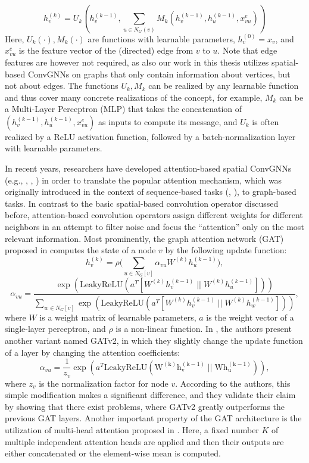 \documentclass[draft,final]{vutinfth} %
\begin{document}
\[
    h_v^{(k)} = U_k (h_v^{(k-1)}, \sum_{u \in N_G(v)} M_k(h_v^{(k-1)}, h_u^{(k-1)}, x_{vu}^{e}))
\]
Here, $U_k(\cdot), M_k(\cdot)$ are functions with learnable parameters, $h_v^{(0)} = x_v$, and $x_{vu}^{e}$ is the feature vector of the (directed) edge from $v$ to $u$. Note that edge features are however not required, as also our work in this thesis utilizes spatial-based ConvGNNs on graphs that only contain information about vertices, but not about edges. 
The functions $U_k, M_k$ can be realized by any learnable function and thus cover many concrete realizations of the concept, for example, $M_k$ can be a Multi-Layer Perceptron (MLP) that takes the concatenation of $(h_v^{(k-1)}, h_u^{(k-1)}, x_{vu}^{e})$ as inputs to compute its message, and $U_k$ is often realized by a ReLU activation function, followed by a batch-normalization \cite{IoffeS15} layer with learnable parameters. 

In recent years, researchers have developed attention-based spatial ConvGNNs (e.g., \cite{Velickovic2018}, \cite{Zhang2018}, \cite{Brody2021}) in order to translate the popular attention mechanism, which was originally introduced in the context of sequence-based tasks (\cite{Bahdanau2015}, \cite{VaswaniSPUJGKP17}), to graph-based tasks. In contrast to the basic spatial-based convolution operator discussed before, attention-based convolution operators assign different weights for different neighbors in an attempt to filter noise and focus the ``attention'' only on the most relevant information. 
Most prominently, the graph attention network (GAT) proposed in \cite{Velickovic2018} computes the state of a node $v$ by the following update function: 
\[
    h_v^{(k)} = \rho \big( \sum_{u \in N_G[v]} \alpha_{vu} W^{(k)} h_u^{(k-1)} \big),
\]
\[ 
    \alpha_{vu} = \frac{\exp(\mathrm{LeakyReLU}(a^T[W^{(k)}h_v^{(k-1)} \; || \; W^{(k)}h_u^{(k-1)}]))}
    {\sum_{w \in N_G[v]} \exp(\mathrm{LeakyReLU}(a^T[W^{(k)}h_v^{(k-1)} \; ||\; W^{(k)}h_w^{(k-1)}]))},
\]
where $W$ is a weight matrix of learnable parameters, $a$ is the weight vector of a single-layer perceptron, and $\rho$ is a non-linear function. 
In \cite{Brody2021}, the authors present another variant named GATv2, in which they slightly change the update function of a layer by changing the attention coefficients:  
\[
    \alpha_{vu} = \frac{1}{z_v} \exp(a^T \mathrm{LeakyReLU(W^{(k)}h_v^{(k-1)} \; || \; W h_u^{(k-1)} )}), 
\]
where $z_v$ is the normalization factor for node $v$.
According to the authors, this simple modification makes a significant difference, and they validate their claim by showing that there exist problems, where GATv2 greatly outperforms the previous GAT layers. 
Another important property of the GAT architecture is the utilization of multi-head attention proposed in \cite{VaswaniSPUJGKP17}. 
Here, a fixed number $K$ of multiple independent attention heads are applied and then their outputs are either concatenated or the element-wise mean is computed. 
\end{document}
